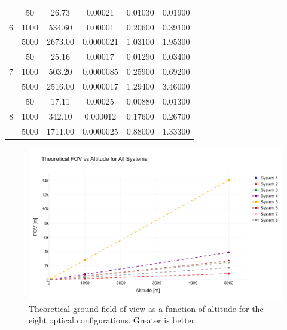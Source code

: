 \begin{table}[H]
\begin{tabular}{|c|c|c|c|c|c|}
        \multirow{3}{*}{6}
         & 50   & 26.73  & 0.00021   & 0.01030  & 0.01900   \\ 
         & 1000 & 534.60 & 0.00001   & 0.20600  & 0.39100   \\ 
         & 5000 & 2673.00& 0.0000021   & 1.03100  & 1.95300   \\ 
        \hline
        
        \multirow{3}{*}{7}
         & 50   & 25.16  & 0.00017   & 0.01290  & 0.03400   \\ 
         & 1000 & 503.20 & 0.0000085   & 0.25900  & 0.69200   \\ 
         & 5000 & 2516.00& 0.0000017   & 1.29400  & 3.46000   \\ 
        \hline
        
        \multirow{3}{*}{8}
         & 50   & 17.11  & 0.00025   & 0.00880  & 0.01300   \\ 
         & 1000 & 342.10 & 0.000012   & 0.17600  & 0.26700   \\ 
         & 5000 & 1711.00& 0.0000025   & 0.88000  & 1.33300   \\ 
        \hline
    \end{tabular}
\end{table}

\begin{figure}[H]
    \centering
    \includegraphics[trim = 0cm 0cm 0cm 2cm, clip, width=0.9\linewidth]{Figures/C2/disenofov.png}
    \caption{Theoretical ground field of view as a function of altitude
             for the eight optical configurations. Greater is better.}
    \label{fig:fov_vs_altitude}
\end{figure}

